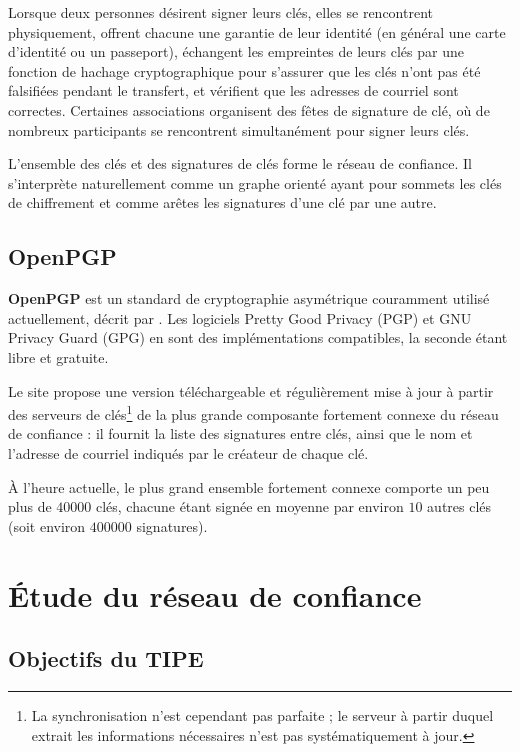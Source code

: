 \documentclass[a4paper]{article}
\newcommand{\deft}[1]{\textbf{#1}}
\begin{document}
Lorsque deux personnes désirent signer leurs clés, elles se rencontrent physiquement, offrent chacune une garantie de leur identité (en général une carte d'identité ou un passeport), échangent les empreintes de leurs clés par une fonction de hachage cryptographique pour s'assurer que les clés n'ont pas été falsifiées pendant le transfert, et vérifient que les adresses de courriel sont correctes. Certaines associations organisent des fêtes de signature de clé, où de nombreux participants se rencontrent simultanément pour signer leurs clés.

L'ensemble des clés et des signatures de clés forme le réseau de confiance. Il s'interprète naturellement comme un graphe orienté ayant pour sommets les clés de chiffrement et comme arêtes les signatures d'une clé par une autre.

\subsection{OpenPGP}

\deft{OpenPGP} est un standard de cryptographie asymétrique couramment utilisé actuellement, décrit par \cite{RFC4880}. Les logiciels Pretty Good Privacy (PGP) et GNU Privacy Guard (GPG) en sont des implémentations compatibles, la seconde étant libre et gratuite.

Le site \cite{W1} propose une version téléchargeable et régulièrement mise à jour à partir des serveurs de clés\footnote{La synchronisation n'est cependant pas parfaite ; le serveur à partir duquel \cite{W1} extrait les informations nécessaires n'est pas systématiquement à jour.} de la plus grande composante fortement connexe du réseau de confiance : il fournit la liste des signatures entre clés, ainsi que le nom et l'adresse de courriel indiqués par le créateur de chaque clé.

À l'heure actuelle, le plus grand ensemble fortement connexe comporte un peu plus de $40000$ clés, chacune étant signée en moyenne par environ $10$ autres clés (soit environ $400000$ signatures).

\section{Étude du réseau de confiance}

\subsection{Objectifs du TIPE}
\end{document}
